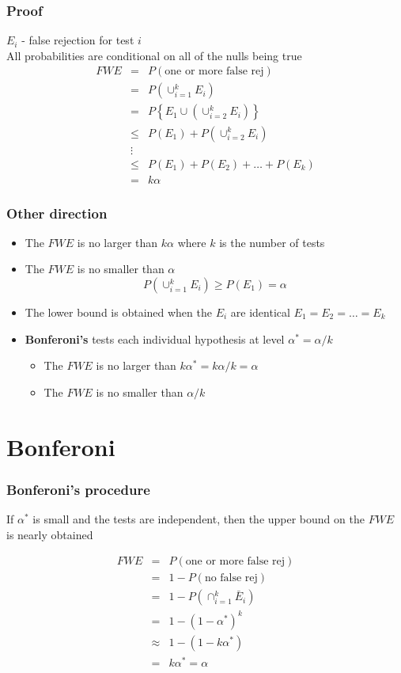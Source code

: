 \documentclass[aspectratio=169]{beamer}
\begin{document}
\begin{frame}\frametitle{Proof}
$E_i$ - false rejection for test $i$ \\
All probabilities are conditional on all of the nulls being true 
\begin{eqnarray*}
FWE 
& =      & P(\mbox{one or more false rej}) \\
& =      & P(\cup_{i=1}^k E_i) \\
& =      & P\left\{E_1 \cup (\cup_{i=2}^k E_i)\right\} \\
& \leq   & P(E_1) + P(\cup_{i=2}^k E_i)\\
& \vdots & \\
& \leq   & P(E_1) + P(E_2) +\hdots+P(E_k)\\
& =      & k\alpha 
\end{eqnarray*}
\end{frame}

\begin{frame}\frametitle{Other direction}
\begin{itemize}
\item The $FWE$ is no larger than $k\alpha$ where $k$ is the number of tests
\item The $FWE$ is no smaller than $\alpha$ 
$$
P(\cup_{i=1}^k E_i) \geq P(E_1) = \alpha
$$
\item The lower bound is obtained when the $E_i$ are identical
  $E_1 = E_2 = \ldots = E_k$ 
\item {\bf Bonferoni's} tests each individual hypothesis at level $\alpha^* = \alpha / k$
  
  \begin{itemize}
  \item The $FWE$ is no larger than $k \alpha^* = k \alpha / k = \alpha$
  \item The $FWE$ is no smaller than $\alpha / k$
  \end{itemize}
\end{itemize}
\end{frame}


\section{Bonferoni}
\begin{frame}\frametitle{Bonferoni's procedure} 
If $\alpha^*$ is small and the tests are independent, then the
upper bound on the $FWE$ is nearly obtained 

\begin{eqnarray*}
 FWE & = & P(\mbox{one or more false rej}) \\
     & = & 1 - P(\mbox{no false rej}) \\
     & = & 1 - P(\cap_{i=1}^k \bar E_i) \\
     & = & 1 - (1 - \alpha^*)^k \\
     & \approx & 1 - (1 - k\alpha^*)\\
     & = & k \alpha^* = \alpha
\end{eqnarray*}
\end{frame}
\end{document}
